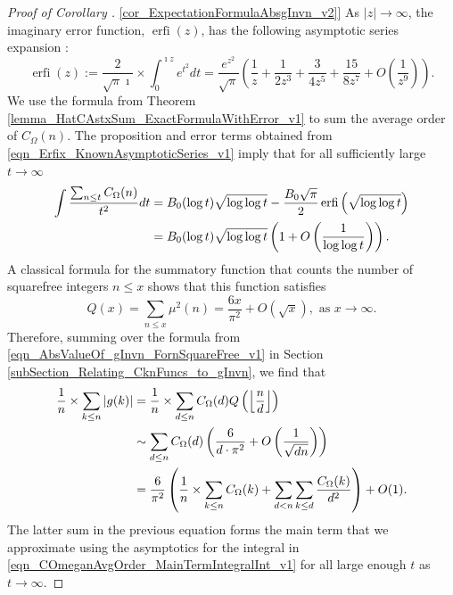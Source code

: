 \documentclass[11pt,reqno,a4letter]{article}
\newcommand{\hlocalref}[1]{\hyperref[#1]{\ref{#1}}}
\numberwithin{equation}{section}
\numberwithin{figure}{section}
\numberwithin{table}{section}
\newcommand{\seqnum}[1]{\href{http://oeis.org/#1}{\color{ProcessBlue}{\underline{#1}}}}
\newcommand{\Floor}[2]{\ensuremath{\left\lfloor \frac{#1}{#2} \right\rfloor}}
\theoremstyle{plain}
\numberwithin{theorem}{section}
\theoremstyle{definition}
\begin{document}
\begin{proof}[Proof of Corollary \hlocalref{cor_ExpectationFormulaAbsgInvn_v2}]  
As $|z| \rightarrow \infty$, the imaginary error function, 
$\operatorname{erfi}(z)$, has the following asymptotic series expansion 
\cite[\S 7.12]{NISTHB}: 
\begin{equation}
\label{eqn_Erfix_KnownAsymptoticSeries_v1}
\operatorname{erfi}(z) := \frac{2}{\sqrt{\pi} \imath} \times \int_0^{\imath z} e^{t^2} dt = 
     \frac{e^{z^2}}{\sqrt{\pi}} \left(\frac{1}{z} + \frac{1}{2z^3} + 
     \frac{3}{4z^5} + \frac{15}{8z^7} + O\left(\frac{1}{z^{9}}\right)\right). 
\end{equation}
We use the formula from Theorem \hlocalref{lemma_HatCAstxSum_ExactFormulaWithError_v1} 
to sum the average order of $C_{\Omega}(n)$.
The proposition and error terms obtained from \eqref{eqn_Erfix_KnownAsymptoticSeries_v1} 
imply that for all sufficiently large $t \rightarrow \infty$ 
\begin{align} 
\notag 
\int \frac{\sum_{n \leq t} C_{\Omega}(n)}{t^2} dt & = 
     B_0 (\log t) \sqrt{\log\log t} - \frac{B_0\sqrt{\pi}}{2} 
     \operatorname{erfi}\left(\sqrt{\log\log t}\right) \\ 
\label{eqn_COmeganAvgOrder_MainTermIntegralInt_v1} 
     & = 
     B_0 (\log t) \sqrt{\log\log t} \left(1 + O\left(\frac{1}{\log\log t}\right)\right). 
\end{align} 
A classical formula for the summatory function that counts the 
number of squarefree integers $n \leq x$ shows that this function satisfies 
\cite[\S 18.6]{HARDYWRIGHT} \cite[\seqnum{A013928}]{OEIS} 
\[ 
Q(x) = \sum_{n \leq x} \mu^2(n) = \frac{6x}{\pi^2} + O\left(\sqrt{x}\right), 
     \text{\ as $x \rightarrow \infty$}. 
\]
Therefore, summing over the formula from 
\eqref{eqn_AbsValueOf_gInvn_FornSquareFree_v1} in 
Section \hlocalref{subSection_Relating_CknFuncs_to_gInvn}, we find that  
\begin{align} 
\notag 
\frac{1}{n} \times \sum_{k \leq n} |g(k)| & = \frac{1}{n} \times \sum_{d \leq n} 
     C_{\Omega}(d) Q\left(\Floor{n}{d}\right) \\ 
\notag 
     & \sim \sum_{d \leq n} C_{\Omega}(d) \left(\frac{6}{d \cdot \pi^2} + O\left(\frac{1}{\sqrt{dn}}\right) 
     \right) \\ 
\notag 
     & = \frac{6}{\pi^2} \left(\frac{1}{n} \times \sum_{k \leq n} C_{\Omega}(k) + \sum_{d<n} 
     \sum_{k \leq d} \frac{C_{\Omega}(k)}{d^2}\right) + O(1). 
\end{align} 
The latter sum in the previous equation forms the main term that we approximate using the 
asymptotics for the integral in 
\eqref{eqn_COmeganAvgOrder_MainTermIntegralInt_v1} for all 
large enough $t$ as $t \rightarrow \infty$. 
\end{proof} 
\end{document}
